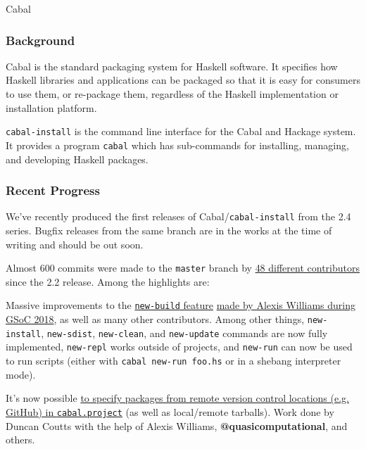 \begin{hcarentry}{Cabal}
\label{cabal}
\label{hackage}
\label{hackagedb}
\makeheader

\subsubsection*{Background}

Cabal is the standard packaging system for Haskell software. It
specifies how Haskell libraries and applications can be packaged so
that it is easy for consumers to use them, or re-package them,
regardless of the Haskell implementation or installation platform.

\texttt{cabal-install} is the command line interface for the Cabal and
Hackage system. It provides a program \texttt{cabal} which has
sub-commands for installing, managing, and developing Haskell packages.

\subsubsection*{Recent Progress}

We've recently produced the first releases of
Cabal/\texttt{cabal-install} from the 2.4 series. Bugfix releases from
the same branch are in the works at the time of writing and should be out soon.

Almost 600 commits were made to the \texttt{master} branch by
\href{https://gist.github.com/23Skidoo/7f07c309776574039b9cc7e29cfaf069}{48
  different contributors} since the 2.2 release. Among the highlights
are:

\begin{compactitem}

\item Massive improvements to the
  \href{https://cabal.readthedocs.io/en/latest/nix-local-build-overview.html#nix-style-local-builds}{\texttt{new-build}
    feature}
  \href{https://typedr.at/posts/what-i-did-on-my-summer-vacation/}{made
    by Alexis Williams during GSoC 2018}, as well as many other
  contributors. Among other things, \texttt{new-install},
  \texttt{new-sdist}, \texttt{new-clean}, and \texttt{new-update}
  commands are now fully implemented, \texttt{new-repl} works outside
  of projects, and \texttt{new-run} can now be used to run scripts
  (either with \texttt{cabal new-run foo.hs} or in a shebang
  interpreter mode).

\item It's now possible
  \href{https://cabal.readthedocs.io/en/latest/nix-local-build.html#specifying-packages-from-remote-version-control-locations}{to
    specify packages from remote version control locations
    (e.g. GitHub) in \texttt{cabal.project}} (as well as local/remote
  tarballs). Work done by Duncan Coutts with the help of Alexis
  Williams, \textbf{@quasicomputational}, and others.


\end{compactitem}
\end{hcarentry}

